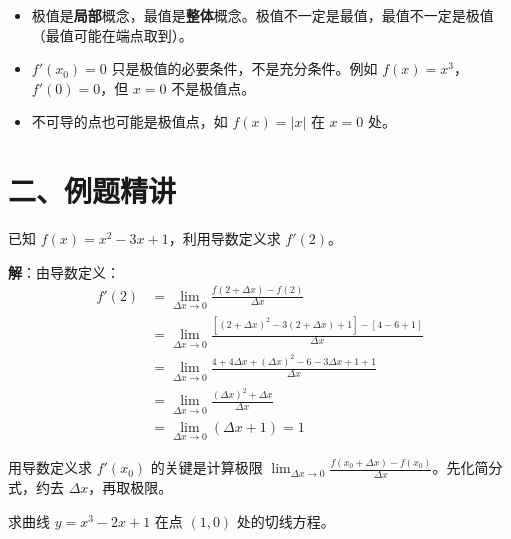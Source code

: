 \documentclass[12pt, a4paper]{ctexart}
\begin{document}
\begin{warnbox}[易错提醒]
\begin{itemize}[leftmargin=2em]
  \item 极值是\textbf{局部}概念，最值是\textbf{整体}概念。极值不一定是最值，最值不一定是极值（最值可能在端点取到）。
  \item $f'(x_0) = 0$ 只是极值的必要条件，不是充分条件。例如 $f(x) = x^3$，$f'(0) = 0$，但 $x = 0$ 不是极值点。
  \item 不可导的点也可能是极值点，如 $f(x) = |x|$ 在 $x = 0$ 处。
\end{itemize}
\end{warnbox}

\section*{\textcolor{examorange}{二、例题精讲}}

\begin{examplebox}[【例题1】利用导数定义求导数]
已知 $f(x) = x^2 - 3x + 1$，利用导数定义求 $f'(2)$。
\end{examplebox}

\textbf{解}：由导数定义：
\begin{align*}
f'(2) &= \lim_{\Delta x \to 0} \frac{f(2 + \Delta x) - f(2)}{\Delta x} \\
&= \lim_{\Delta x \to 0} \frac{[(2+\Delta x)^2 - 3(2+\Delta x) + 1] - [4 - 6 + 1]}{\Delta x} \\
&= \lim_{\Delta x \to 0} \frac{4 + 4\Delta x + (\Delta x)^2 - 6 - 3\Delta x + 1 + 1}{\Delta x} \\
&= \lim_{\Delta x \to 0} \frac{(\Delta x)^2 + \Delta x}{\Delta x} \\
&= \lim_{\Delta x \to 0} (\Delta x + 1) = 1
\end{align*}

\begin{tipbox}[方法总结]
用导数定义求 $f'(x_0)$ 的关键是计算极限 $\displaystyle\lim_{\Delta x \to 0} \frac{f(x_0 + \Delta x) - f(x_0)}{\Delta x}$。先化简分式，约去 $\Delta x$，再取极限。
\end{tipbox}

\begin{examplebox}[【例题2】求曲线的切线方程]
求曲线 $y = x^3 - 2x + 1$ 在点 $(1, 0)$ 处的切线方程。
\end{examplebox}
\end{document}
